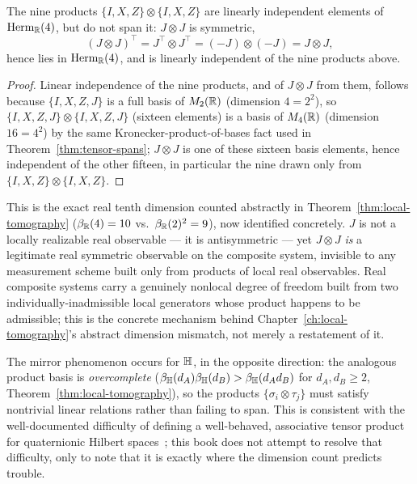 \begin{proposition}
\label{prop:JJ-missing}
The nine products $\{I,X,Z\}\otimes\{I,X,Z\}$ are linearly independent
elements of $\mathrm{Herm}_{\mathbb{R}}(4)$, but do not span it: $J\otimes J$ is
symmetric,
\begin{equation}
(J\otimes J)^\top = J^\top \otimes J^\top = (-J)\otimes(-J) = J\otimes J,
\end{equation}
hence lies in $\mathrm{Herm}_{\mathbb{R}}(4)$, and is linearly independent of the nine
products above.
\end{proposition}

\begin{proof}
Linear independence of the nine products, and of $J\otimes J$ from them,
follows because $\{I,X,Z,J\}$ is a full basis of $M_2(\mathbb{R})$ (dimension $4 =
2^2$), so $\{I,X,Z,J\}\otimes\{I,X,Z,J\}$ (sixteen elements) is a basis of
$M_4(\mathbb{R})$ (dimension $16=4^2$) by the same Kronecker-product-of-bases fact
used in Theorem~\ref{thm:tensor-spans}; $J\otimes J$ is one of these sixteen
basis elements, hence independent of the other fifteen, in particular the
nine drawn only from $\{I,X,Z\}\otimes\{I,X,Z\}$.
\end{proof}

\begin{remark}
This is the exact real tenth dimension counted abstractly in
Theorem~\ref{thm:local-tomography} ($\beta_{\mathbb{R}}(4)=10$ vs.\ $\beta_{\mathbb{R}}(2)^2=9$),
now identified concretely. $J$ is not a locally realizable real observable —
it is antisymmetric — yet $J\otimes J$ \emph{is} a legitimate real symmetric
observable on the composite system, invisible to any measurement scheme built
only from products of local real observables. Real composite systems carry a
genuinely nonlocal degree of freedom built from two individually-inadmissible
local generators whose product happens to be admissible; this is the concrete
mechanism behind Chapter~\ref{ch:local-tomography}'s abstract dimension
mismatch, not merely a restatement of it.
\end{remark}

\begin{remark}
The mirror phenomenon occurs for $\mathbb{H}$, in the opposite direction: the
analogous product basis is \emph{overcomplete}
($\beta_{\mathbb{H}}(d_A)\beta_{\mathbb{H}}(d_B) > \beta_{\mathbb{H}}(d_Ad_B)$ for $d_A,d_B\ge2$,
Theorem~\ref{thm:local-tomography}), so the products $\{\sigma_i\otimes
\tau_j\}$ must satisfy nontrivial linear relations rather than failing to
span. This is consistent with the well-documented difficulty of defining a
well-behaved, associative tensor product for quaternionic Hilbert
spaces~\cite{adler1995}; this book does not attempt to resolve that
difficulty, only to note that it is exactly where the dimension count
predicts trouble.
\end{remark}

